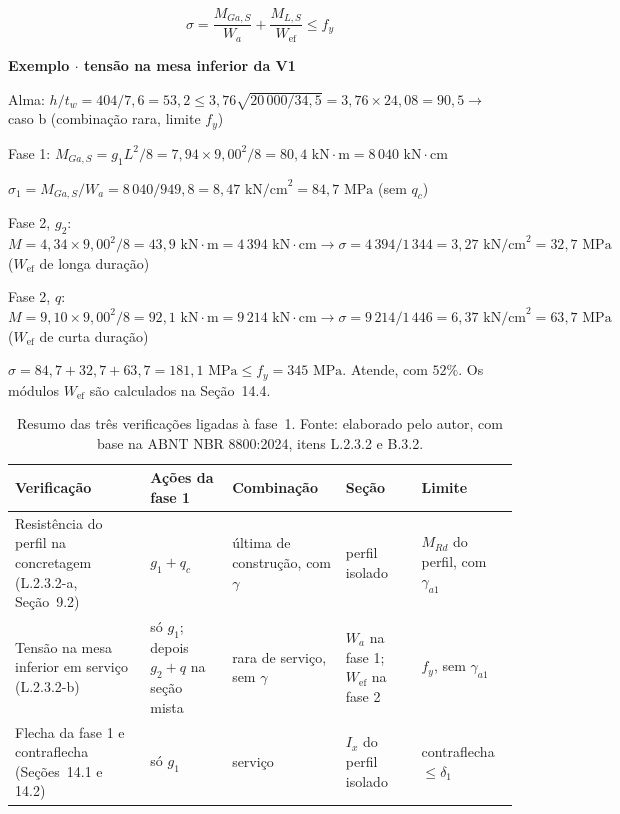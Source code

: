 \documentclass[11pt,a4paper]{article}
\newcommand{\caixaexemplo}[2]{%
  \par\vspace{6pt}\noindent\colorbox{examplebg}{%
    \parbox{\dimexpr\linewidth-2\fboxsep\relax}{%
      \vspace{4pt}\textbf{\color{exampleaccent}#1}\par\vspace{3pt}#2\vspace{4pt}%
    }%
  }\par\vspace{6pt}%
}
\begin{document}
\begin{equation}
  \sigma = \frac{M_{Ga,S}}{W_a} + \frac{M_{L,S}}{W_{\text{ef}}} \le f_y
  \label{eq:tensao-servico}
\end{equation}

\caixaexemplo{Exemplo $\cdot$ tensão na mesa inferior da V1}{%
Alma: $h/t_w = 404/7{,}6 = 53{,}2 \le 3{,}76\sqrt{20\,000/34{,}5} = 3{,}76 \times 24{,}08 = 90{,}5 \rightarrow$ caso b (combinação rara, limite $f_y$)\par
Fase 1: $M_{Ga,S} = g_1 L^2/8 = 7{,}94 \times 9{,}00^2/8 = 80{,}4\text{ kN}\cdot\text{m} = 8\,040\text{ kN}\cdot\text{cm}$\par
$\sigma_1 = M_{Ga,S}/W_a = 8\,040/949{,}8 = 8{,}47\text{ kN/cm}^2 = 84{,}7\text{ MPa}$ (sem $q_c$)\par
Fase 2, $g_2$: $M = 4{,}34 \times 9{,}00^2/8 = 43{,}9\text{ kN}\cdot\text{m} = 4\,394\text{ kN}\cdot\text{cm} \rightarrow \sigma = 4\,394/1\,344 = 3{,}27\text{ kN/cm}^2 = 32{,}7\text{ MPa}$ ($W_{\text{ef}}$ de longa duração)\par
Fase 2, $q$: $M = 9{,}10 \times 9{,}00^2/8 = 92{,}1\text{ kN}\cdot\text{m} = 9\,214\text{ kN}\cdot\text{cm} \rightarrow \sigma = 9\,214/1\,446 = 6{,}37\text{ kN/cm}^2 = 63{,}7\text{ MPa}$ ($W_{\text{ef}}$ de curta duração)\par
$\sigma = 84{,}7 + 32{,}7 + 63{,}7 = 181{,}1\text{ MPa} \le f_y = 345\text{ MPa}$. Atende, com $52\%$. Os módulos $W_{\text{ef}}$ são calculados na Seção~14.4.}

\begin{table}[!htbp]
  \centering
  \caption{Resumo das três verificações ligadas à fase~1. Fonte: elaborado pelo autor, com base na ABNT NBR 8800:2024, itens L.2.3.2 e B.3.2.}
  \label{tab:verificacoes-fase1}
  \footnotesize
  \begin{tabularx}{\linewidth}{XXXXX}
    \toprule
    \textbf{Verificação} & \textbf{Ações da fase 1} & \textbf{Combinação} & \textbf{Seção} & \textbf{Limite} \\
    \midrule
    Resistência do perfil na concretagem (L.2.3.2-a, Seção~9.2) & $g_1 + q_c$ & última de construção, com $\gamma$ & perfil isolado & $M_{Rd}$ do perfil, com $\gamma_{a1}$ \\
    \addlinespace
    Tensão na mesa inferior em serviço (L.2.3.2-b) & só $g_1$; depois $g_2 + q$ na seção mista & rara de serviço, sem $\gamma$ & $W_a$ na fase 1; $W_{\text{ef}}$ na fase 2 & $f_y$, sem $\gamma_{a1}$ \\
    \addlinespace
    Flecha da fase 1 e contraflecha (Seções~14.1 e 14.2) & só $g_1$ & serviço & $I_x$ do perfil isolado & contraflecha $\le \delta_1$ \\
    \bottomrule
  \end{tabularx}
\end{table}
\end{document}
